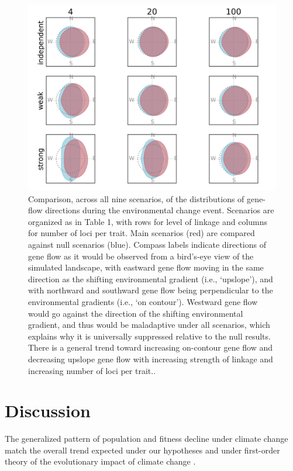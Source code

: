 \documentclass[9pt,twocolumn,twoside,lineno]{pnas-new}
\begin{document}
\begin{figure}
\centering
\includegraphics[width=17.8cm]{gene_flow.jpg}
\caption{Comparison, across all nine scenarios, of the distributions of gene-flow directions during the environmental change event. Scenarios are organized as in Table 1, with rows for level of linkage and columns for number of loci per trait. Main scenarios (red) are compared against null scenarios (blue). Compass labels indicate directions of gene flow as it would be observed from a bird’s-eye view of the simulated landscape, with eastward gene flow moving in the same direction as the shifting environmental gradient (i.e., ‘upslope’), and with northward and southward gene flow being perpendicular to the environmental gradients (i.e., ‘on contour’). Westward gene flow would go against the direction of the shifting environmental gradient, and thus would be maladaptive under all scenarios, which explains why it is universally suppressed relative to the null results. There is a general trend toward increasing on-contour gene flow and decreasing upslope gene flow with increasing strength of linkage and increasing number of loci per trait..
}
\label{fig:gene_flow}
\end{figure}


\section*{Discussion}
The generalized pattern of population and fitness decline under climate change match the
overall trend expected under our hypotheses and under first-order theory of
the evolutionary impact of climate change \cite{aitken_whitlock}.
\end{document}
